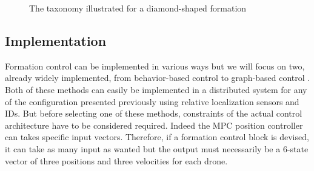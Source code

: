 \documentclass[a4paper, 12pt]{report}
\begin{document}
\begin{figure}[htbp]
\centering
{}
\hspace{0.2cm}
\hspace{0.2cm}
\caption{The taxonomy illustrated for a diamond-shaped formation}
\label{fig:graphs}
\end{figure}

\subsection{Implementation}
Formation control can be implemented in various ways but we will focus on two, already widely implemented, from behavior-based control \cite{Arkin1999, Mataric2002, Pugh2009} to graph-based control  \cite{Gowal2013, Falconi2010}. Both of these methods can easily be implemented in a distributed system for any of the configuration presented previously using relative localization sensors and IDs. But before selecting one of these methods, constraints of the actual control architecture have to be considered required. Indeed the MPC position controller can takes specific input vectors. Therefore, if a formation control block is devised, it can take as many input as wanted but the output must necessarily be a 6-state vector of three positions and three velocities for each drone.
\end{document}
